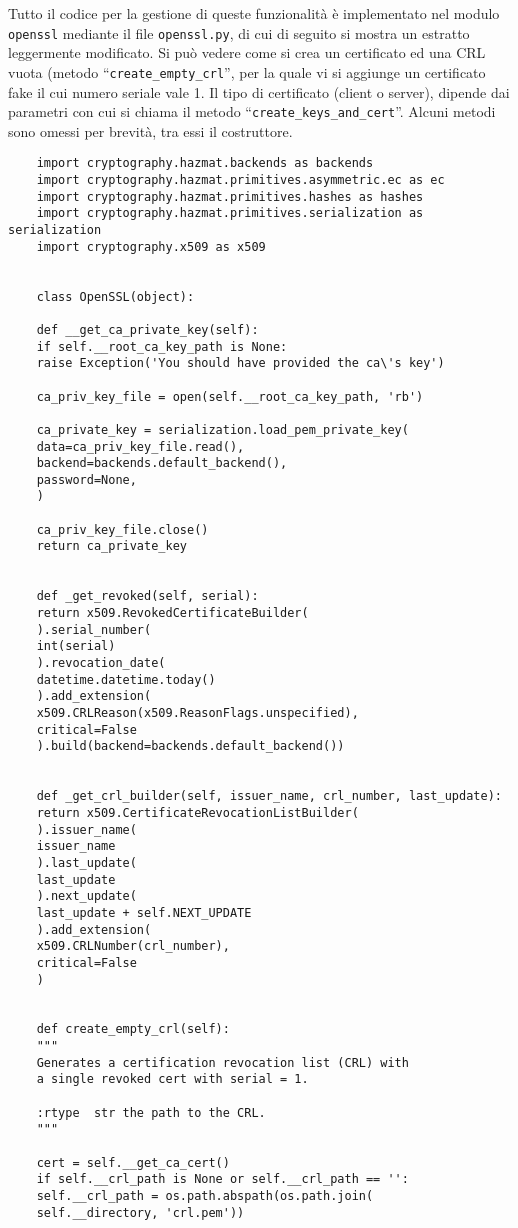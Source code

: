 Tutto il codice per la gestione di queste funzionalità è implementato nel modulo \texttt{openssl}
mediante il file \texttt{openssl.py}, di cui di seguito si mostra un estratto leggermente
modificato.
Si può vedere come si crea un certificato ed una CRL vuota (metodo
``\texttt{create\_empty\_crl}'', per la quale vi
si aggiunge un certificato fake il cui numero seriale vale 1.
Il tipo di certificato (client o server), dipende dai parametri con cui si chiama il metodo
``\texttt{create\_keys\_and\_cert}''.
Alcuni metodi sono omessi per brevità, tra essi il costruttore.
\begin{verbatim}
	import cryptography.hazmat.backends as backends
	import cryptography.hazmat.primitives.asymmetric.ec as ec
	import cryptography.hazmat.primitives.hashes as hashes
	import cryptography.hazmat.primitives.serialization as serialization
	import cryptography.x509 as x509
	
	
	class OpenSSL(object):
	
	def __get_ca_private_key(self):
	if self.__root_ca_key_path is None:
	raise Exception('You should have provided the ca\'s key')
	
	ca_priv_key_file = open(self.__root_ca_key_path, 'rb')
	
	ca_private_key = serialization.load_pem_private_key(
	data=ca_priv_key_file.read(),
	backend=backends.default_backend(),
	password=None,
	)
	
	ca_priv_key_file.close()
	return ca_private_key
	
	
	def _get_revoked(self, serial):
	return x509.RevokedCertificateBuilder(
	).serial_number(
	int(serial)
	).revocation_date(
	datetime.datetime.today()
	).add_extension(
	x509.CRLReason(x509.ReasonFlags.unspecified),
	critical=False
	).build(backend=backends.default_backend())
	
	
	def _get_crl_builder(self, issuer_name, crl_number, last_update):
	return x509.CertificateRevocationListBuilder(
	).issuer_name(
	issuer_name
	).last_update(
	last_update
	).next_update(
	last_update + self.NEXT_UPDATE
	).add_extension(
	x509.CRLNumber(crl_number),
	critical=False
	)    
	
	
	def create_empty_crl(self):
	"""
	Generates a certification revocation list (CRL) with
	a single revoked cert with serial = 1.
	
	:rtype  str the path to the CRL.
	"""
	
	cert = self.__get_ca_cert()
	if self.__crl_path is None or self.__crl_path == '':
	self.__crl_path = os.path.abspath(os.path.join(
	self.__directory, 'crl.pem'))
	

\end{verbatim}
